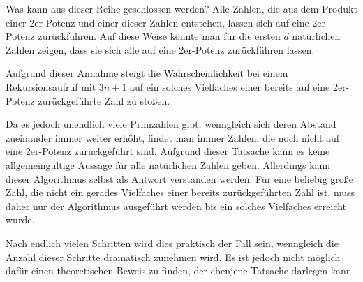 \documentclass[10pt,a4paper,oneside,ngerman,numbers=noenddot]{scrartcl}
\begin{document}
	Was kann aus dieser Reihe geschlossen werden? Alle Zahlen, die aus dem Produkt einer 2er-Potenz und einer dieser Zahlen entstehen, lassen sich auf eine 2er-Potenz zurückführen. Auf diese Weise könnte man für die ersten $d$ natürlichen Zahlen zeigen, dass sie sich alle auf eine 2er-Potenz zurückführen lassen.
	
	Aufgrund dieser Annahme steigt die Wahrscheinlichkeit bei einem Rekursionsaufruf mit $3n+1$ auf ein solches Vielfaches einer bereits auf eine 2er-Potenz zurückgeführte Zahl zu stoßen.
	
	Da es jedoch unendlich viele Primzahlen gibt, wenngleich sich deren Abstand zueinander immer weiter erhöht, findet man immer Zahlen, die noch nicht auf eine 2er-Potenz zurückgeführt sind. Aufgrund dieser Tatsache kann es keine allgemeingültige Aussage für alle natürlichen Zahlen geben. Allerdings kann dieser Algorithmus selbst als Antwort verstanden werden. Für eine beliebig große Zahl, die nicht ein gerades Vielfaches einer bereits zurückgeführten Zahl ist, muss daher nur der Algorithmus ausgeführt werden bis ein solches Vielfaches erreicht wurde.
	
	Nach endlich vielen Schritten wird dies praktisch der Fall sein, wenngleich die Anzahl dieser Schritte dramatisch zunehmen wird. Es ist jedoch nicht möglich dafür einen theoretischen Beweis zu finden, der ebenjene Tatsache darlegen kann.
\end{document}
